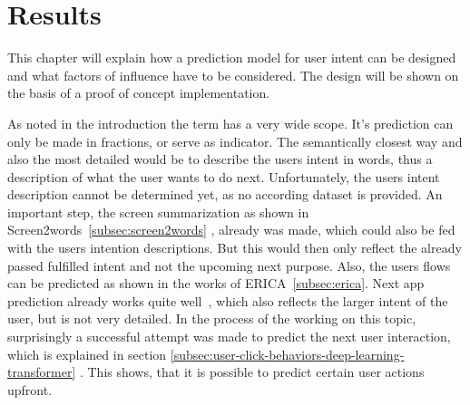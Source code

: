 \chapter{Results}
\label{ch:results}

%

This chapter will explain how a prediction model for user intent can be designed and what factors of influence have to be considered.
The design will be shown on the basis of a proof of concept implementation.

As noted in the introduction the term  has a very wide scope.
It's prediction can only be made in fractions, or serve as indicator.
The semantically closest way and also the most detailed would be to describe the users intent in words, thus a description of what the user wants to do next.
Unfortunately, the users intent description cannot be determined yet, as no according dataset is provided.
An important step, the screen summarization as shown in Screen2words~\ref{subsec:screen2words} \cite{wang2021screen2words}, already was made, which could also be fed with the users intention descriptions.
But this would then only reflect the already passed fulfilled intent and not the upcoming next purpose.
Also, the users flows can be predicted as shown in the works of ERICA~\ref{subsec:erica}.
Next app prediction already works quite well~\cite{katsarou2022whatsnextapp}, which also reflects the larger intent of the user, but is not very detailed.
In the process of the working on this topic, surprisingly a successful attempt was made to predict the next user interaction, which is explained in section \ref{subsec:user-click-behaviors-deep-learning-transformer} \cite{zhou2021large}.
This shows, that it is possible to predict certain user actions upfront.


